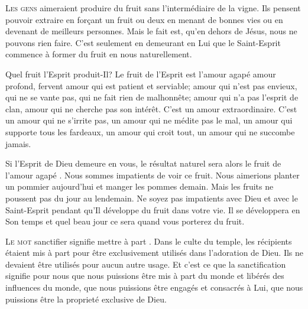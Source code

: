 \lettrine{L}{es gens} aimeraient produire du fruit
 sans l'intermédiaire de la vigne. Ils pensent pouvoir extraire
 en forçant un fruit ou deux en menant de bonnes vies ou en devenant
 de meilleurs personnes. Mais le fait est, qu'en dehors de Jésus,
 nous ne pouvons rien faire. C'est seulement en demeurant en Lui
 que le Saint-Esprit commence à former du fruit en nous \ocadr naturellement.

Quel fruit l'Esprit produit-Il? Le fruit de l'Esprit est l'amour
 \og agapé \fg{} \ocadr amour profond, fervent \fcadr{} amour qui est patient
 et serviable; amour qui n'est pas envieux, qui ne se vante pas,
 qui ne fait rien de malhonnête; amour qui n'a pas l'esprit de clan,
 amour qui ne cherche pas son intérêt. C'est un amour extraordinaire.
 C'est un amour qui ne s'irrite pas, un amour qui ne médite pas le mal,
 un amour qui supporte tous les fardeaux, un amour qui croit tout,
 un amour qui ne succombe jamais.


Si l'Esprit de Dieu demeure en vous, le résultat naturel sera alors
 le fruit de l'amour \og agapé \fg{}.
 Nous sommes impatients de voir ce fruit.
 Nous aimerions planter un pommier aujourd'hui et manger les pommes demain.
 Mais les fruits ne poussent pas du jour au lendemain.
 Ne soyez pas impatients avec Dieu et avec le Saint-Esprit pendant
 qu'Il développe du fruit dans votre vie.
 Il se développera en Son temps
 \ocadr et quel beau jour ce sera quand vous porterez du fruit.

\dvrule






\lettrine{L}{e mot} \og sanctifier \fg{} signifie \og mettre à part \fg{}.
 Dans le culte du temple, les récipients étaient mis à part pour être
 exclusivement utilisés dans l'adoration de Dieu.
 Ils ne devaient être utilisés pour aucun autre usage.
 Et c'est ce que la sanctification signifie pour nous
 \ocadr que nous puissions être mis à part du monde et libérés
 des influences du monde, que nous puissions être engagés et consacrés à Lui,
 que nous puissions être la proprieté exclusive de Dieu.

